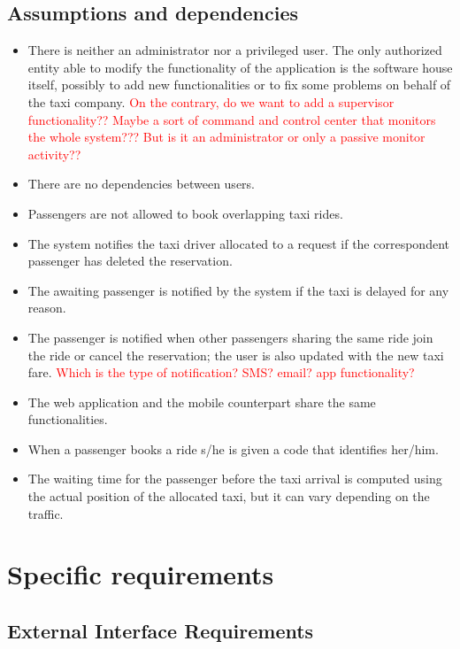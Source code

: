 \documentclass[a4paper,11pt]{report} %
\begin{document}
	\subsection{Assumptions and dependencies}
		\begin{itemize}
			\item There is neither an administrator nor a privileged user. The only authorized entity able to modify the functionality of the application is the software house itself, possibly to add new functionalities or to fix some problems on behalf of the taxi company. \textcolor{red}{On the contrary, do we want to add a supervisor functionality?? Maybe a sort of command and control center that monitors the whole system??? But is it an administrator or only a passive monitor activity??}
			\item There are no dependencies between users.
			\item Passengers are not allowed to book overlapping taxi rides.
			\item The system notifies the taxi driver allocated to a request if the correspondent passenger has deleted the reservation.
			\item The awaiting passenger is notified by the system if the taxi is delayed for any reason.
			\item The passenger is notified when other passengers sharing the same ride join the ride or cancel the reservation; the user is also updated with the new taxi fare. \textcolor{red}{Which is the type of notification? SMS? email? app functionality?}
			\item The web application and the mobile counterpart share the same functionalities.
			\item When a passenger books a ride s/he is given a code that identifies her/him.
			\item The waiting time for the passenger before the taxi arrival is computed using the actual position of the allocated taxi, but it can vary depending on the traffic.
		\end{itemize}
	
	\pagebreak
	
	\section{Specific requirements}
	
	\subsection{External Interface Requirements} 
	
\end{document}
